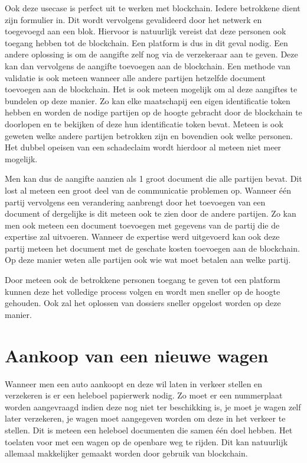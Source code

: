 Ook deze usecase is perfect uit te werken met blockchain. Iedere betrokkene dient zijn formulier in. Dit wordt vervolgens gevalideerd door het netwerk en toegevoegd aan een blok. Hiervoor is natuurlijk vereist dat deze personen ook toegang hebben tot de blockchain. Een platform is dus in dit geval nodig. Een andere oplossing is om de aangifte zelf nog via de verzekeraar aan te geven. Deze kan dan vervolgens de aangifte toevoegen aan de blockchain. Een methode van validatie is ook meteen wanneer alle andere partijen hetzelfde document toevoegen aan de blockchain. Het is ook meteen mogelijk om al deze aangiftes te bundelen op deze manier. Zo kan elke maatschapij een eigen identificatie token hebben en worden de nodige partijen op de hoogte gebracht door de blockchain te doorlopen en te bekijken of deze hun identificatie token bevat. Meteen is ook geweten welke andere partijen betrokken zijn en bovendien ook welke personen. Het dubbel opeisen van een schadeclaim wordt hierdoor al meteen niet meer mogelijk. 

Men kan dus de aangifte aanzien als 1 groot document die alle partijen bevat. Dit lost al meteen een groot deel van de communicatie problemen op. Wanneer één partij vervolgens een verandering aanbrengt door het toevoegen van een document of dergelijke is dit meteen ook te zien door de andere partijen. Zo kan men ook meteen een document toevoegen met gegevens van de partij die de expertise zal uitvoeren. Wanneer de expertise werd uitgevoerd kan ook deze partij  meteen het document met de geschate kosten toevoegen aan de blockchain. Op deze manier weten alle partijen ook wie wat moet betalen aan welke partij.

Door meteen ook de betrokkene personen toegang te geven tot een platform kunnen deze het volledige process volgen en wordt men sneller op de hoogte gehouden. Ook zal het oplossen van dossiers sneller opgelost worden op deze manier. 

\section{Aankoop van een nieuwe wagen}
Wanneer men een auto aankoopt en deze wil laten in verkeer stellen en verzekeren is er een heleboel papierwerk nodig. Zo moet er een nummerplaat worden aangevraagd indien deze nog niet ter beschikking is, je moet je wagen zelf later verzekeren, je wagen moet aangegeven worden om deze in het verkeer te stellen. Dit is meteen een heleboel documenten die samen één doel hebben. Het toelaten voor met een wagen op de openbare weg te rijden. Dit kan natuurlijk allemaal makkelijker gemaakt worden door gebruik van blockchain. 

